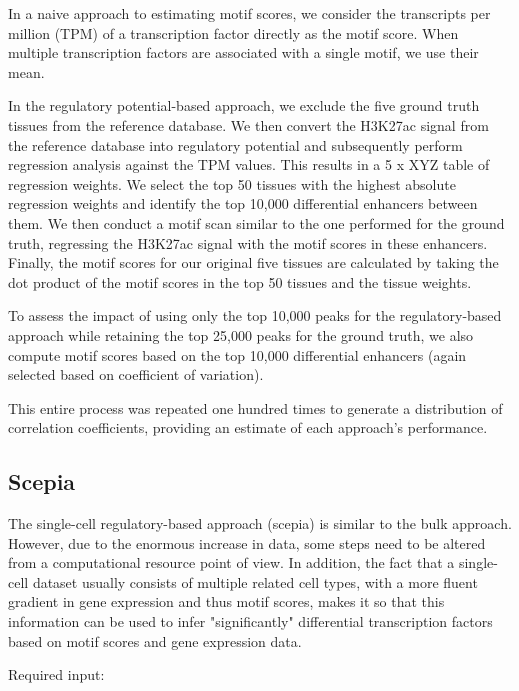 In a naive approach to estimating motif scores, we consider the transcripts per million (TPM) of a transcription factor directly as the motif score. When multiple transcription factors are associated with a single motif, we use their mean.

In the regulatory potential-based approach, we exclude the five ground truth tissues from the reference database. We then convert the H3K27ac signal from the reference database into regulatory potential and subsequently perform regression analysis against the TPM values. This results in a 5 x XYZ table of regression weights. We select the top 50 tissues with the highest absolute regression weights and identify the top 10,000 differential enhancers between them. We then conduct a motif scan similar to the one performed for the ground truth, regressing the H3K27ac signal with the motif scores in these enhancers. Finally, the motif scores for our original five tissues are calculated by taking the dot product of the motif scores in the top 50 tissues and the tissue weights.

To assess the impact of using only the top 10,000 peaks for the regulatory-based approach while retaining the top 25,000 peaks for the ground truth, we also compute motif scores based on the top 10,000 differential enhancers (again selected based on coefficient of variation).

This entire process was repeated one hundred times to generate a distribution of correlation coefficients, providing an estimate of each approach's performance.

\subsection{Scepia}

The single-cell regulatory-based approach (scepia) is similar to the bulk approach. However, due to the enormous increase in data, some steps need to be altered from a computational resource point of view. In addition, the fact that a single-cell dataset usually consists of multiple related cell types, with a more fluent gradient in gene expression and thus motif scores, makes it so that this information can be used to infer "significantly" differential transcription factors based on motif scores and gene expression data.

\noindent
Required input:

